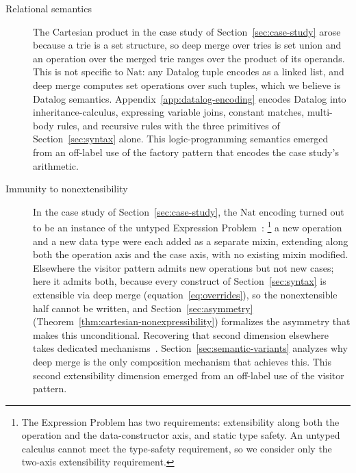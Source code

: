 \begin{description}
  \item[Relational semantics]
    The Cartesian product in the case study of
    Section~\ref{sec:case-study} arose because a trie is a set
    structure, so deep merge over tries is set union and an operation
    over the merged trie ranges over the product of its operands.
    This is not specific to $\mathrm{Nat}$: any Datalog tuple encodes
    as a linked list, and deep merge computes set operations over such
    tuples, which we believe is Datalog semantics.
    Appendix~\ref{app:datalog-encoding} encodes Datalog into
    inheritance-calculus, expressing variable joins,
    constant matches, multi-body rules, and recursive rules with
    the three primitives of Section~\ref{sec:syntax} alone.
    This logic-programming semantics emerged from an off-label use of
    the factory pattern that encodes the case study's arithmetic.

  \item[Immunity to nonextensibility]\label{item:immunity}
    In the case study of Section~\ref{sec:case-study}, the
    $\mathrm{Nat}$ encoding turned out to be an instance of the
    untyped Expression
    Problem~\cite{wadler1998-expression-problem}:%
    \footnote{
      The Expression Problem has two requirements: extensibility along
      both the operation and the data-constructor axis, and static
      type safety. An untyped calculus cannot meet the type-safety
      requirement, so we consider only the two-axis extensibility
      requirement.
    }
    a new operation and a new data type were each added as a separate
    mixin, extending along both the operation axis and the case axis,
    with no existing mixin modified.
    Elsewhere the visitor pattern admits new operations but not new
    cases; here it admits both, because every construct of
    Section~\ref{sec:syntax} is extensible via deep merge
    (equation~\ref{eq:overrides}), so the nonextensible half cannot be
    written, and Section~\ref{sec:asymmetry}
    (Theorem~\ref{thm:cartesian-nonexpressibility}) formalizes the
    asymmetry that makes this unconditional.
    Recovering that second dimension elsewhere takes dedicated
    mechanisms~\cite{liang1995-monad-transformers, lammel2003-scrap-your-boilerplate, loh2006-open-data-types,
      swierstra2008-data-types-a-la-carte, carette2009-finally-tagless, oliveira2012-object-algebras,
      kiselyov2013-extensible-effects, wu2014-effect-handlers-in-scope, kiselyov2015-freer-monads,
    wang2016-expression-problem-trivially, leijen2017-row-typed-algebraic-effects, poulsen2023-hefty-algebras}.
    Section~\ref{sec:semantic-variants} analyzes why deep merge
    is the only composition mechanism that achieves this.
    This second extensibility dimension emerged from an off-label use
    of the visitor pattern.

\end{description}

